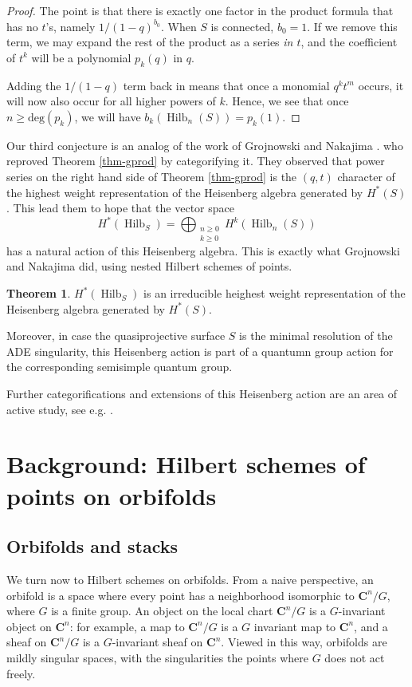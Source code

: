 \documentclass{amsart}[12pt]
\theoremstyle{definition}
\newtheorem{theorem}[dummy]{Theorem}
\newcommand{\C}{\mathbf{C}}
\DeclareMathOperator{\Hilb}{Hilb}
\newcommand{\HG}{\Hilb}
\begin{document}
\begin{proof}
The point is that there is exactly one factor in the product formula that has no $t$'s, namely $1/(1-q)^{b_0}$.  When $S$ is connected, $b_0=1$.  If we remove this term, we may expand the rest of the product as a series \emph{in $t$}, and the coefficient of $t^k$ will be a polynomial $p_k(q)$ in $q$.  

Adding the $1/(1-q)$ term back in means that once a monomial $q^kt^m$ occurs, it will now also occur for all higher powers of $k$.  Hence, we see that once $n\geq\text{deg}(p_k)$, we will have $b_k(\Hilb_n(S))=p_k(1)$.
\end{proof}

Our third conjecture is an analog of the work of Grojnowski and Nakajima \cite{grojnowski, nakajimaheisenberg}. who reproved Theorem \ref{thm-gprod} by categorifying it.  They observed that power series on the right hand side of Theorem \ref{thm-gprod} is the $(q,t)$ character of the highest weight representation of the Heisenberg algebra generated by $H^*(S)$.  This lead them to hope that the vector space 
$$H^*(\HG_S)=\bigoplus_{\substack{n\geq 0 \\ k\geq 0}} H^k(\Hilb_n(S))$$
has a natural action of this Heisenberg algebra.  This is exactly what Grojnowski and Nakajima did, using nested Hilbert schemes of points.  

\begin{theorem} \label{thm:grojnowskinakajima}
$H^*(\HG_S)$ is an irreducible heighest weight representation of the Heisenberg algebra generated by $H^*(S)$.
  \end{theorem}

Moreover, in case the quasiprojective surface $S$ is the minimal resolution of the ADE singularity, this Heisenberg action is part of a quantumn group action for the corresponding semisimple quantum group.

Further categorifications and extensions of this Heisenberg action are an area of active study, see e.g. \cite{CL, CL2, FT, SV}.







\section{Background: Hilbert schemes of points on orbifolds}


\subsection{Orbifolds and stacks}
We turn now to Hilbert schemes on orbifolds.  From a naive perspective, an orbifold is a space where every point has a neighborhood isomorphic to $\C^n/G$, where $G$ is a finite group.  An object on the local chart $\C^n/G$ is a $G$-invariant object on $\C^n$: for example, a map to $\C^n/G$ is a $G$ invariant map to $\C^n$, and a sheaf on $\C^n/G$ is a $G$-invariant sheaf on $\C^n$.  Viewed in this way, orbifolds are mildly singular spaces, with the singularities the points where $G$ does not act freely.
\end{document}
